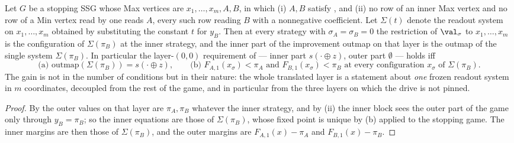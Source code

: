 \begin{theorem}
\label{lvl:layer00-exact}
Let $G$ be a stopping SSG whose Max vertices are $x_1,\dots,x_m,A,B$, in which
(i) $A,B$ satisfy , and (ii) no row of an inner Max vertex and no
row of a Min vertex read by one reads $A$, every such row reading $B$ with a
nonnegative coefficient.  Let $\Sigma(t)$ denote the readout system on
$x_1,\dots,x_m$ obtained by substituting the constant $t$ for $y_B$.  Then at
every strategy with $\sigma_A=\sigma_B=0$ the restriction of $\val_\sigma$ to
$x_1,\dots,x_m$ is the configuration of $\Sigma(\pi_B)$ at the inner strategy,
and the inner part of the improvement outmap on that layer is the outmap of the
single system $\Sigma(\pi_B)$.  In particular the layer-$(0,0)$ requirement of
 --- inner part $s(\cdot\oplus z)$, outer part $\emptyset$ ---
holds iff
\[
 \text{(a) } \mathrm{outmap}(\Sigma(\pi_B))=s(\cdot\oplus z),\qquad
 \text{(b) } F_{A,1}(x_\sigma)<\pi_A \text{ and } F_{B,1}(x_\sigma)<\pi_B
 \text{ at every configuration } x_\sigma \text{ of } \Sigma(\pi_B).
\]
The gain is not in the number of conditions but in their nature: the whole
translated layer is a statement about \emph{one} frozen readout system in $m$
coordinates, decoupled from the rest of the game, and in particular from the
three layers on which the drive is not pinned.
\end{theorem}

\begin{proof}
By  the outer values on that layer are $\pi_A,\pi_B$ whatever the
inner strategy, and by (ii) the inner block sees the outer part of the game only
through $y_B=\pi_B$; so the inner equations are those of $\Sigma(\pi_B)$, whose
fixed point is unique by (b) applied to the stopping game.
The inner margins are then those of $\Sigma(\pi_B)$, and the outer margins are
$F_{A,1}(x)-\pi_A$ and $F_{B,1}(x)-\pi_B$.
\end{proof}

